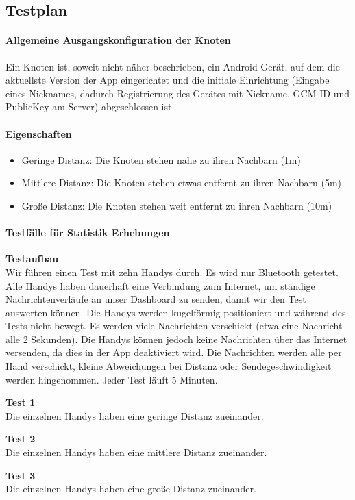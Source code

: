 \subsection{Testplan}

\paragraph{Allgemeine Ausgangskonfiguration der Knoten}

Ein Knoten ist, soweit nicht näher beschrieben, ein Android-Gerät, auf dem die aktuellste Version der App eingerichtet und die initiale Einrichtung (Eingabe eines Nicknames, dadurch Registrierung des Gerätes mit Nickname, GCM-ID und PublicKey am Server) abgeschlossen ist.

\paragraph{Eigenschaften}

\begin{itemize}
  \tightlist
  \item Geringe Distanz: Die Knoten stehen nahe zu ihren Nachbarn (1m)
  \item Mittlere Distanz: Die Knoten stehen etwas entfernt zu ihren Nachbarn (5m)
  \item Große Distanz: Die Knoten stehen weit entfernt zu ihren Nachbarn (10m)
\end{itemize}

\paragraph{Testfälle für Statistik Erhebungen}

\textbf{Testaufbau}\\
Wir führen einen Test mit zehn Handys durch. Es wird nur Bluetooth getestet. Alle Handys haben dauerhaft eine Verbindung zum Internet, um ständige Nachrichtenverläufe an unser Dashboard zu senden, damit wir den Test auswerten können. Die Handys werden kugelförmig positioniert und während des Tests nicht bewegt. Es werden viele Nachrichten verschickt (etwa eine Nachricht alle 2 Sekunden). Die Handys können jedoch keine Nachrichten über das Internet versenden, da dies in der App deaktiviert wird. Die Nachrichten werden alle per Hand verschickt, kleine Abweichungen bei Distanz oder Sendegeschwindigkeit werden hingenommen. Jeder Test läuft 5 Minuten.

\textbf{Test 1}\\
Die einzelnen Handys haben eine geringe Distanz zueinander.

\textbf{Test 2}\\
Die einzelnen Handys haben eine mittlere Distanz zueinander.

\textbf{Test 3}\\
Die einzelnen Handys haben eine große Distanz zueinander.
